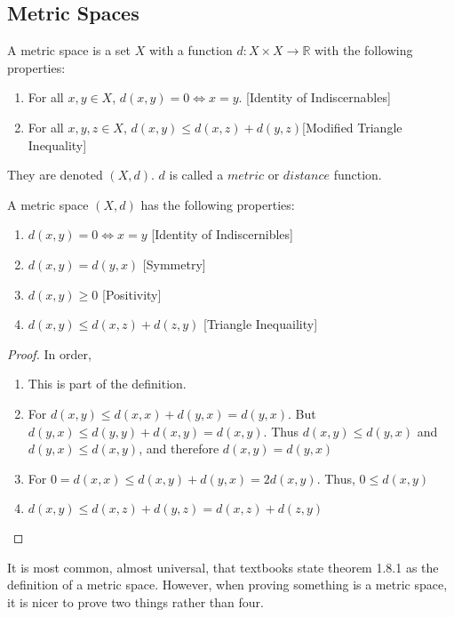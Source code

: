 \documentclass[crop=false,class=book]{standalone}
\begin{document}
\subsection{Metric Spaces}
\begin{definition}
A metric space is a set $X$ with a function $d:X\times X\rightarrow \mathbb{R}$ with the following properties:
\begin{enumerate}
\item For all $x,y\in X$, $d(x,y) = 0\Leftrightarrow x=y$. \hfill [Identity of Indiscernables]
\item For all $x,y,z\in X$, $d(x,y) \leq d(x,z)+d(y,z)$\hfill [Modified Triangle Inequality]
\end{enumerate}
They are denoted $(X,d)$. $d$ is called a $metric$ or $distance$ function.
\end{definition}
\begin{theorem}
A metric space $(X,d)$ has the following properties:
\begin{enumerate}
    \item $d(x,y) = 0 \Leftrightarrow x=y$ \hfill [Identity of Indiscernibles]
    \item $d(x,y) = d(y,x)$ \hfill [Symmetry]
    \item $d(x,y) \geq 0$ \hfill [Positivity]
    \item $d(x,y) \leq d(x,z)+d(z,y)$ \hfill [Triangle Inequaility]
\end{enumerate}
\end{theorem}
\begin{proof}
In order,
\begin{enumerate}
    \item This is part of the definition.
    \item For $d(x,y) \leq d(x,x)+d(y,x) = d(y,x)$. But $d(y,x) \leq d(y,y)+d(x,y) = d(x,y)$. Thus $d(x,y)\leq d(y,x)$ and $d(y,x) \leq d(x,y)$, and therefore $d(x,y) = d(y,x)$
    \item For $0=d(x,x) \leq d(x,y)+d(y,x) = 2d(x,y)$. Thus, $0\leq d(x,y)$
    \item $d(x,y)\leq d(x,z)+d(y,z) = d(x,z)+d(z,y)$
\end{enumerate}
\end{proof}
\begin{remark}
It is most common, almost universal, that textbooks state theorem 1.8.1 as the definition of a metric space. However, when proving something is a metric space, it is nicer to prove two things rather than four.
\end{remark}
\end{document}
